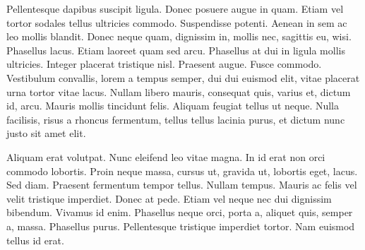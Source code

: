 \begin{prefacio}

  Pellentesque dapibus suscipit ligula.  Donec posuere augue in quam.
  Etiam vel tortor sodales tellus ultricies commodo.  Suspendisse
  potenti.  Aenean in sem ac leo mollis blandit.  Donec neque quam,
  dignissim in, mollis nec, sagittis eu, wisi.  Phasellus lacus.
  Etiam laoreet quam sed arcu.  Phasellus at dui in ligula mollis
  ultricies.  Integer placerat tristique nisl.  Praesent augue.  Fusce
  commodo.  Vestibulum convallis, lorem a tempus semper, dui dui
  euismod elit, vitae placerat urna tortor vitae lacus.  Nullam libero
  mauris, consequat quis, varius et, dictum id, arcu.  Mauris mollis
  tincidunt felis.  Aliquam feugiat tellus ut neque.  Nulla facilisis,
  risus a rhoncus fermentum, tellus tellus lacinia purus, et dictum
  nunc justo sit amet elit.

  Aliquam erat volutpat.  Nunc eleifend leo vitae magna.  In id erat
  non orci commodo lobortis.  Proin neque massa, cursus ut, gravida
  ut, lobortis eget, lacus.  Sed diam.  Praesent fermentum tempor
  tellus.  Nullam tempus.  Mauris ac felis vel velit tristique
  imperdiet.  Donec at pede.  Etiam vel neque nec dui dignissim
  bibendum.  Vivamus id enim.  Phasellus neque orci, porta a, aliquet
  quis, semper a, massa.  Phasellus purus.  Pellentesque tristique
  imperdiet tortor.  Nam euismod tellus id erat.

\end{prefacio}